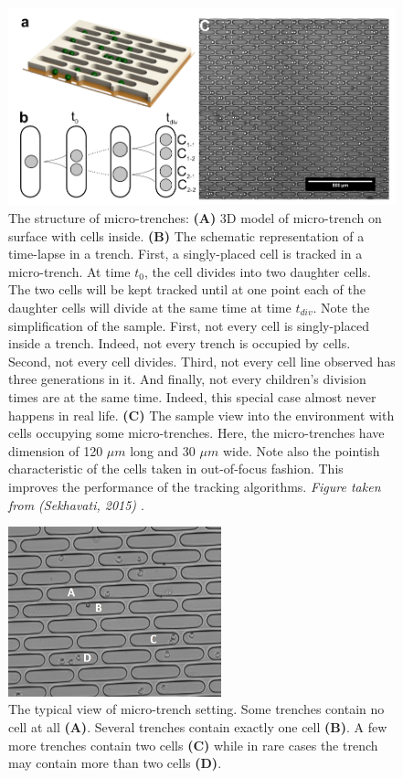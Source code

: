\documentclass[pdftex,12pt,a4paper]{report}
\begin{document}
\begin{figure}[H]
\centering
\includegraphics[width=.9\textwidth]{images/trenches-sekhavati}
\caption[The structure of micro-trenches]{The structure of micro-trenches: \textbf{(A)} 3D model of micro-trench on surface with cells inside. \textbf{(B)} The schematic representation of a time-lapse in a trench. First, a singly-placed cell is tracked in a micro-trench. At time $t_0$, the cell divides into two daughter cells. The two cells will be kept tracked until at one point each of the daughter cells will divide at the same time at time $t_{div}$. Note the simplification of the sample. First, not every cell is singly-placed inside a trench. Indeed, not every trench is occupied by cells. Second, not every cell divides. Third, not every cell line observed has three generations in it. And finally, not every children's division times are at the same time. Indeed, this special case almost never happens in real life. \textbf{(C)} The sample view into the environment with cells occupying some micro-trenches. Here, the micro-trenches have dimension of 120 $\mu m$ long and 30 $\mu m$ wide. Note also the pointish characteristic of the cells taken in out-of-focus fashion. This improves the performance of the tracking algorithms. \textit{Figure taken from (Sekhavati, 2015) \cite{sekhavati2015dynamic}}.}
\label{fig:microtrench_design}
\end{figure}

\begin{figure}[H]
\centering
\includegraphics[width=0.55\textwidth]{images/microtrench_in}
\caption[The typical view of micro-trench setting]{The typical view of micro-trench setting. Some trenches contain no cell at all \textbf{(A)}. Several trenches contain exactly one cell \textbf{(B)}. A few more trenches contain two cells \textbf{(C)} while in rare cases the trench may contain more than two cells \textbf{(D)}.}
\label{fig:microtrench_sample}
\end{figure}
\end{document}
